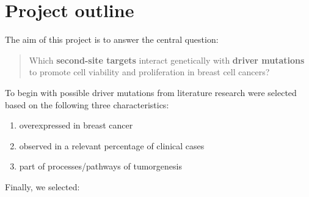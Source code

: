 \documentclass[]{article}
\providecommand{\tightlist}{%
  \setlength{\itemsep}{0pt}\setlength{\parskip}{0pt}}
\begin{document}
\hypertarget{project-outline}{%
\section{Project outline}\label{project-outline}}

The aim of this project is to answer the central question:

\begin{quote}
Which \textbf{second-site targets} interact genetically with
\textbf{driver mutations} to promote cell viability and proliferation in
breast cell cancers?
\end{quote}

To begin with possible driver mutations from literature research were
selected based on the following three characteristics:

\begin{enumerate}
\def\labelenumi{\arabic{enumi}.}
\tightlist
\item
  overexpressed in breast cancer
\item
  observed in a relevant percentage of clinical cases
\item
  part of processes/pathways of tumorgenesis
\end{enumerate}

Finally, we selected:
\end{document}
